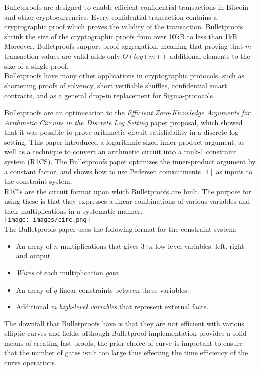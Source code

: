 \documentclass[letterpaper, 10 pt, conference]{ieeeconf}  %
\begin{document}
Bulletproofs are designed to enable efficient confidential transactions in Bitcoin and other cryptocurrencies. Every confidential transaction contains a cryptographic proof which proves the validity of the transaction. Bulletproofs shrink the size of the cryptographic proofs from over 10kB to less than 1kB. Moreover, Bulletproofs support proof aggregation, meaning that proving that $m$ transaction values are valid adds only $O(log(m))$ additional elements to the size of a single proof.\\

Bulletproofs have many other applications in cryptographic protocols, such as shortening proofs of solvency, short verifiable shuffles, confidential smart contracts, and as a general drop-in replacement for Sigma-protocols.

Bulletproofs are an optimisation to the \emph{Efficient Zero-Knowledge Arguments for
Arithmetic Circuits in the Discrete Log Setting} paper proposal, which showed that it was possible to prove arithmetic circuit satisfiability in a discrete log setting. This paper introduced a logarithmic-sized inner-product argument, as well as a technique to convert an arithmetic circuit into a rank-1 constraint system (R1CS). The Bulletproofs paper optimizes the inner-product argument by a constant factor, and shows how to use Pedersen commitments$[4]$ as inputs to the constraint system.\\
R1C's are the circuit format upon which Bulletproofs are built. The purpose for using these is that they expresses a linear combinations of various variables and their multiplications in a systematic manner.\\
\texttt{[image: images/circ.png]}\\ \newline
The Bulletproofs paper uses the following format for the constraint system: 
\begin{itemize}
    \item  An array of $n$ multiplications that gives $3 \cdot n$ low-level variables: left, right and output
    \item \emph{Wires} of each multiplication \emph{gate}.
    \item An array of $q$ linear constraints between these variables.
    \item Additional \emph{m high-level variables} that represent external facts.
\end{itemize} 
The downfall that Bulletproofs have is that they are not efficient with various elliptic curves and fields; although Bulletproof implementation provides a solid means of creating fast proofs, the prior choice of curve is important to ensure that the number of gates isn't too large thus effecting the time efficiency of the curve operations.  
\end{document}
